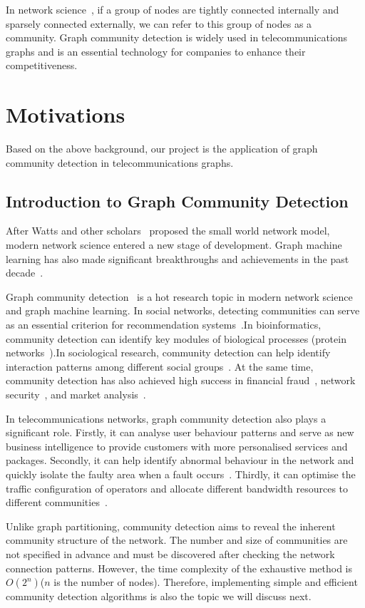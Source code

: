 \documentclass[ %
                    author={Tengyao Tu},
                supervisor={Dr. James Pope},
                    degree={MSc},
                     title={A New Perspective on Graph Community Detection: Combining Traditional Methods with Deep Learning Approaches},
                  subtitle={Applying to Telecom Networks and Diverse Datasets},
                      type={},
                      year={2024}]{dissertation}
\begin{document}
In network science~\cite{barabasi2013network}, if a group of nodes are tightly connected internally and sparsely connected externally, we can refer to this group of nodes as a community. Graph community detection is widely used in telecommunications graphs and is an essential technology for companies to enhance their competitiveness.
\section{Motivations}
Based on the above background, our project is the application of graph community detection in telecommunications graphs.
\subsection{Introduction to Graph Community Detection}
After Watts and other scholars~\cite{watts1998collective} proposed the small world network model, modern network science entered a new stage of development. Graph machine learning has also made significant breakthroughs and achievements in the past decade~\cite{xia2021graph}.

Graph community detection~\cite{fortunato2010community} is a hot research topic in modern network science and graph machine learning. In social networks, detecting communities can serve as an essential criterion for recommendation systems~\cite{bedi2016community}.In bioinformatics, community detection can identify key modules of biological processes (protein networks~\cite{manipur2021community}).In sociological research, community detection can help identify interaction patterns among different social groups~\cite{solomon2019understanding}. At the same time, community detection has also achieved high success in financial fraud~\cite{li2022internet}, network security~\cite{chen2022mobile}, and market analysis~\cite{rahimnezhad2020application}.

In telecommunications networks, graph community detection also plays a significant role. Firstly, it can analyse user behaviour patterns and serve as new business intelligence to provide customers with more personalised services and packages. Secondly, it can help identify abnormal behaviour in the network and quickly isolate the faulty area when a fault occurs~\cite{he2020fault}. Thirdly, it can optimise the traffic configuration of operators and allocate different bandwidth resources to different communities~\cite{yuan2024huawei}.

Unlike graph partitioning, community detection aims to reveal the inherent community structure of the network. The number and size of communities are not specified in advance and must be discovered after checking the network connection patterns. However, the time complexity of the exhaustive method is $O(2^n)$(\( n \) is the number of nodes). Therefore, implementing simple and efficient community detection algorithms is also the topic we will discuss next.
\end{document}
